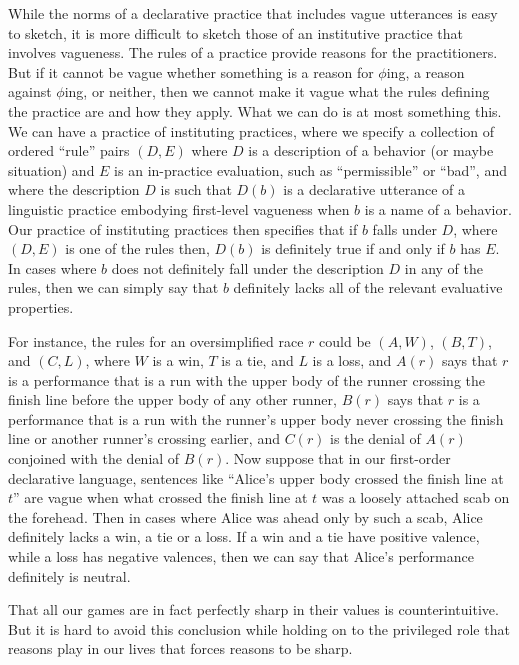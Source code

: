 While the norms of a declarative practice that includes vague utterances is easy to sketch, it is more difficult to sketch those of 
an institutive practice that involves vagueness. The rules of a practice provide reasons for the practitioners. But if
it cannot be vague whether something is a reason for $\phi$ing, a reason against $\phi$ing, or neither, then we cannot make it
vague what the rules defining the practice are and how they apply. What we can do is at most something this. We can have a practice 
of instituting practices, where we specify a collection of ordered ``rule'' pairs $(D,E)$ where $D$ is a description of a behavior (or maybe situation) and $E$ is an in-practice evaluation, such as ``permissible'' 
or ``bad'', and where the description $D$ is such that $D(b)$ is a declarative utterance of a linguistic practice embodying first-level 
vagueness when $b$ is a name of a behavior. Our practice of instituting practices then specifies that if $b$ falls under $D$, where
$(D,E)$ is one of the rules then, $D(b)$ is definitely true if and only if $b$ has $E$.
In cases where $b$ does not definitely fall under the description $D$ in any of the rules, then we can simply say that $b$ definitely
lacks all of the relevant evaluative properties. 

For instance, the rules for an oversimplified race $r$ could be $(A,W)$, $(B,T)$, and $(C,L)$, where $W$ is a win, $T$ is a tie, 
and $L$ is a loss, and $A(r)$ says that $r$ is a performance that is a run with the upper body of the runner crossing the finish
line before the upper body of any other runner, $B(r)$ says that $r$ is a performance that is a run with the runner's upper body never
crossing the finish line or another runner's crossing earlier, and $C(r)$ is the denial of $A(r)$ conjoined with the denial of $B(r)$.
Now suppose that in our first-order declarative language, sentences like ``Alice's upper body crossed the finish line at $t$'' are vague
when what crossed the finish line at $t$ was a loosely attached scab on the forehead. Then in cases where Alice was ahead only by such
a scab, Alice definitely lacks a win, a tie or a loss. If a win and a tie have positive valence, while a loss has negative valences, then
we can say that Alice's performance definitely is neutral.

That all our games are in fact perfectly sharp in their values is counterintuitive. But it is hard to avoid this conclusion while holding 
on to the privileged role that reasons play in our lives that forces reasons to be sharp.

